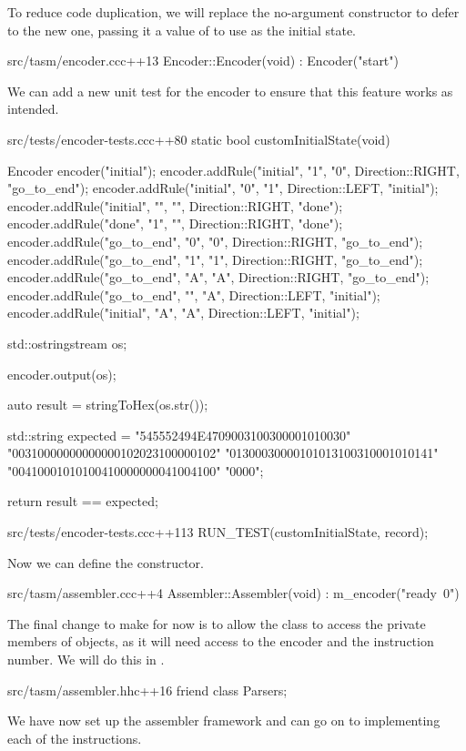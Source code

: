 To reduce code duplication, we will replace the no-argument constructor to defer to the new one, passing it a value of  to use as the initial state.

\begin{file}{src/tasm/encoder.cc}{c++}{13}
Encoder::Encoder(void) : Encoder("start")
{
}
\end{file}

We can add a new unit test for the encoder to ensure that this feature works as intended.

\begin{file}{src/tests/encoder-tests.cc}{c++}{80}
static bool customInitialState(void)
{
    Encoder encoder("initial");
    encoder.addRule("initial", "1", "0", Direction::RIGHT, "go_to_end");
    encoder.addRule("initial", "0", "1", Direction::LEFT, "initial");
    encoder.addRule("initial", "", "", Direction::RIGHT, "done");
    encoder.addRule("done", "1", "", Direction::RIGHT, "done");
    encoder.addRule("go_to_end", "0", "0", Direction::RIGHT, "go_to_end");
    encoder.addRule("go_to_end", "1", "1", Direction::RIGHT, "go_to_end");
    encoder.addRule("go_to_end", "A", "A", Direction::RIGHT, "go_to_end");
    encoder.addRule("go_to_end", "", "A", Direction::LEFT, "initial");
    encoder.addRule("initial", "A", "A", Direction::LEFT, "initial");

    std::ostringstream os;

    encoder.output(os);

    auto result = stringToHex(os.str());

    std::string expected =
        "545552494E4709003100300001010030"
        "00310000000000000102023100000102"
        "01300030000101013100310001010141"
        "00410001010100410000000041004100"
        "0000";

    return result == expected;
}
\end{file}

\begin{file}{src/tests/encoder-tests.cc}{c++}{113}
    RUN_TEST(customInitialState, record);
\end{file}

Now we can define the  constructor.

\begin{file}{src/tasm/assembler.cc}{c++}{4}
Assembler::Assembler(void) : m_encoder("ready~0")
{
}    
\end{file}

The final change to make for now is to allow the  class to access the private members of  objects, as it will need access to the encoder and the instruction number. We will do this in .

\begin{file}{src/tasm/assembler.hh}{c++}{16}
    friend class Parsers;
\end{file}

We have now set up the assembler framework and can go on to implementing each of the instructions.